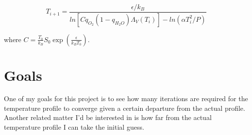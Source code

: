 \documentclass[twoside]{article}
\begin{document}
\begin{equation}
	T_{i+1} = \frac{\epsilon/k_B}{ln[C q_{O_2} (1 - q_{H_2 O}) \Lambda_V (T_i)] - ln(\alpha T_i^2 / P)}
\end{equation}

\noindent where $C = \frac{T_0}{k_B} S_0 \exp\left(\frac{\epsilon}{k_B T_0}\right)$.

\section{Goals}
One of my goals for this project is to see how many iterations are required for the temperature profile to converge given a certain departure from the actual profile. Another related matter I'd be interested in is how far from the actual temperature profile I can take the initial guess.
\end{document}
